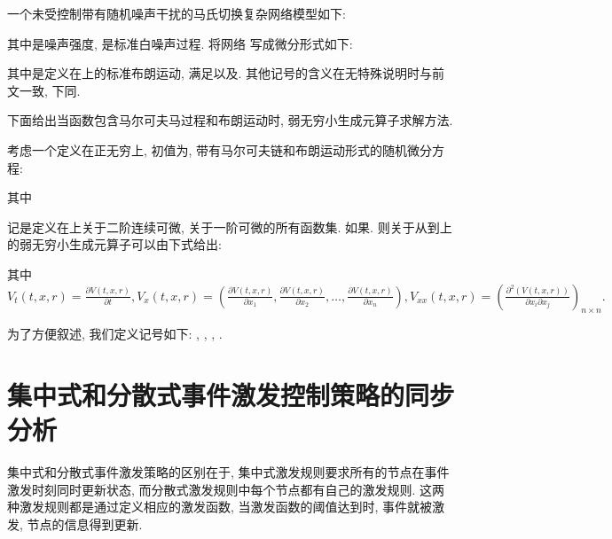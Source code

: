         一个未受控制带有随机噪声干扰的马氏切换复杂网络模型如下:
        \begin{comment}\label{sys:gensys}
        \begin{split}
            \dot{x}_{i}(t)=f(x_{i}(t))-\rho(t)\sum^N_{j=1}l_{ij}(r_t)\Gamma[x_{j}(t)-x_{i}(t)+(\varepsilon_{ij}(t)\otimes\mathbf{1}_n)\xi_{ij}(t)],\quad i=1,2,\cdots,N,
        \end{split}
        \end{comment}
      其中是噪声强度, 是标准白噪声过程. 将网络  写成微分形式如下:
      \begin{comment}\label{sys-dt}
      \nonumber dx_{i}(t)=&\Big[f(x_{i}(t))-\rho(t)\sum^N_{j=1}l_{ij}(r_t)\Gamma(x_{j}(t)-x_{i}(t))\Big]dt\\
      &-\rho(t)\sum^N_{j=1}l_{ij}(r_t)\Gamma(\varepsilon_{ij}(t)\otimes\mathbf{1}_n)dw_{ij}(t), \quad i = 1,\cdots,N,
        \end{comment}
       其中是定义在上的标准布朗运动, 满足以及. 其他记号的含义在无特殊说明时与前文一致, 下同.

        下面给出当函数包含马尔可夫马过程和布朗运动时, 弱无穷小生成元算子求解方法.
        \begin{lem}\label{ET}{\rm{}}
        考虑一个定义在正无穷上, 初值为, 带有马尔可夫链和布朗运动形式的随机微分方程:

        其中

        记是定义在上关于二阶连续可微, 关于一阶可微的所有函数集. 如果.
        则关于从到上的弱无穷小生成元算子可以由下式给出:
        \begin{comment}
        \mathcal{L} V(t,x,r)=&V_t{(t,x,r)}+V_{x}{(t,x,r)}f(t,x,r) \notag \\
                 &+\frac{1}{2}\mathrm{tr}\big [\sigma(t,x,r)^\top V_{xx}\sigma(t,x,r)\big ]+\sum_{j=1}^M\gamma_{ij}V(t,x,j),
        \end{comment}
        其中\\$V_t{(t,x,r)}=\frac{\partial V(t,x,r) }{\partial t},V_{x}{(t,x,r)}=(\frac{\partial V(t,x,r) }{\partial x_1},
        \frac{\partial V(t,x,r) }{\partial x_2},\ldots,\frac{\partial V(t,x,r) }{\partial x_n}),V_{xx}{(t,x,r)}=(\frac{\partial^2(V(t,x,r)) }{\partial x_i \partial x_j})_{n\times n}.$
         \end{lem}

        为了方便叙述, 我们定义记号如下: , , , .

\section{集中式和分散式事件激发控制策略的同步分析}\label{result}
        集中式和分散式事件激发策略的区别在于, 集中式激发规则要求所有的节点在事件激发时刻同时更新状态, 而分散式激发规则中每个节点都有自己的激发规则. 这两种激发规则都是通过定义相应的激发函数, 当激发函数的阈值达到时, 事件就被激发, 节点的信息得到更新.
